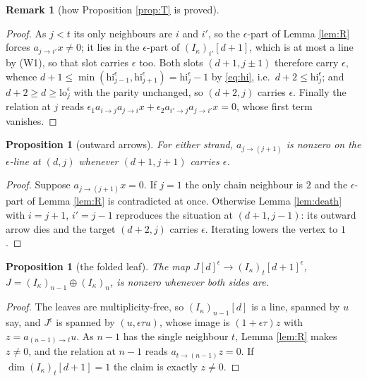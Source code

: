 \documentclass[11pt,reqno]{amsart}
\theoremstyle{plain}
\newtheorem{proposition}[theorem]{Proposition}
\theoremstyle{definition}
\newtheorem{remark}[theorem]{Remark}
\newcommand{\ka}{\kappa}
\begin{document}
\begin{remark}[how Proposition \ref{prop:T} is proved]
\begin{proof}
As $j<t$ its only neighbours are $i$ and $i'$, so the $\epsilon$-part of Lemma
\ref{lem:R} forces $a_{j\to i'}x\ne0$; it lies in the $\epsilon$-part of
$(I_\ka)_{i'}[d+1]$, which is at most a line by (W1), so that slot carries
$\epsilon$ too.  Both slots $(d+1,j\pm1)$ therefore carry $\epsilon$, whence
$d+1\le\min(\mathrm{hi}^{\epsilon}_{j-1},\mathrm{hi}^{\epsilon}_{j+1})
=\mathrm{hi}^{\epsilon}_j-1$ by \eqref{eq:hi}, i.e.\
$d+2\le\mathrm{hi}^{\epsilon}_j$; and $d+2\ge d\ge\mathrm{lo}^{\epsilon}_j$ with
the parity unchanged, so $(d+2,j)$ carries $\epsilon$.  Finally the relation at
$j$ reads $\epsilon_1a_{i\to j}a_{j\to i}x+\epsilon_2a_{i'\to j}a_{j\to i'}x=0$,
whose first term vanishes.
\end{proof}

\begin{proposition}[outward arrows]\label{prop:W4out}
For either strand, $a_{j\to(j+1)}$ is nonzero on the $\epsilon$-line at $(d,j)$
whenever $(d+1,j+1)$ carries $\epsilon$.
\end{proposition}

\begin{proof}
Suppose $a_{j\to(j+1)}x=0$.  If $j=1$ the only chain neighbour is $2$ and the
$\epsilon$-part of Lemma \ref{lem:R} is contradicted at once.  Otherwise Lemma
\ref{lem:death} with $i=j+1$, $i'=j-1$ reproduces the situation at $(d+1,j-1)$:
its outward arrow dies and the target $(d+2,j)$ carries $\epsilon$.  Iterating
lowers the vertex to $1$.
\end{proof}

\begin{proposition}[the folded leaf]\label{prop:W4l}
The map $J[d]^{\epsilon}\to(I_\ka)_t[d+1]^{\epsilon}$,
$J=(I_\ka)_{n-1}\oplus(I_\ka)_n$, is nonzero whenever both sides are.
\end{proposition}

\begin{proof}
The leaves are multiplicity-free, so $(I_\ka)_{n-1}[d]$ is a line, spanned by
$u$ say, and $J^{\epsilon}$ is spanned by $(u,\epsilon\tau u)$, whose image is
$(1+\epsilon\tau)z$ with $z=a_{(n-1)\to t}u$.  As $n-1$ has the single
neighbour $t$, Lemma \ref{lem:R} makes $z\ne0$, and the relation at $n-1$ reads
$a_{t\to(n-1)}z=0$.  If $\dim(I_\ka)_t[d+1]=1$ the claim is exactly $z\ne0$.


\end{proof}
\end{remark}
\end{document}
